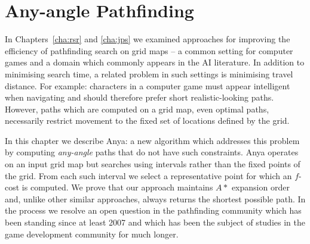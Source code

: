 \chapter{Any-angle Pathfinding}
\label{cha:anya}
In Chapters~\ref{cha:rsr} and \ref{cha:jps} we examined approaches for
improving the efficiency of pathfinding search on grid maps -- a common
setting for computer games and a domain which commonly appears in the AI
literature. 
In addition to minimising search time, a related problem in such settings
is minimising travel distance. For example: characters in a computer game 
must appear intelligent when navigating and should therefore prefer short
realistic-looking paths. However, paths which are computed on a grid map, 
even optimal paths, necessarily restrict movement to the fixed set of 
locations defined by the grid. 
\par
In this chapter we describe Anya: a new algorithm which addresses this
problem by computing \emph{any-angle} paths that do not have such constraints.
Anya operates on an input grid map but searches using intervals rather than 
the fixed points of the grid. 
From each such interval we select a representative point for which an
$f$-cost is computed. 
We prove that our approach maintains $A*$ expansion order and, unlike other
similar approaches, always returns the shortest possible path.
In the process we resolve an open question in the pathfinding community which
has been standing since at least 2007 and which has been the subject of
studies in the game development community for much longer.

